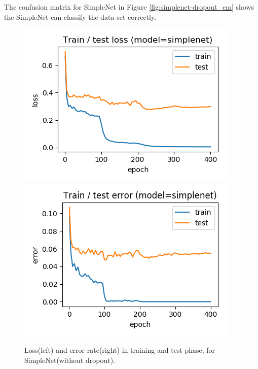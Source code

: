 \documentclass[journal]{IEEEtran}
\begin{document}
The confusion matrix for SimpleNet in Figure \ref{fig:simplenet-dropout_cm} shows the SimpleNet can classify the data set correctly.

\begin{figure}[htb]
  \includegraphics[width=\linewidth]{images/simplenet-loss.png}
\endminipage\hfill
{}
  \includegraphics[width=\linewidth]{images/simplenet-error.png}
\endminipage
\caption{Loss(left) and error rate(right) in training and test phase, for SimpleNet(without dropout).}\label{fig:simplenet_loss}
\end{figure}
\end{document}

